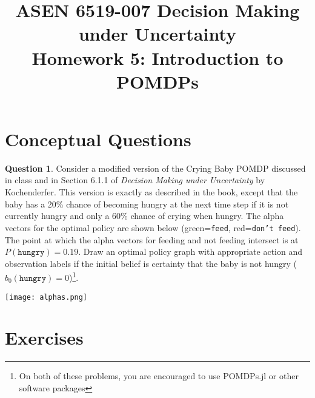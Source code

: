 \documentclass{article}
\title{ASEN 6519-007 Decision Making under Uncertainty\\
       Homework 5: Introduction to POMDPs}
\theoremstyle{definition}
\newtheorem{question}[thm]{Question}
\begin{document}
\maketitle

\section{Conceptual Questions}

\begin{question}
    Consider a modified version of the Crying Baby POMDP discussed in class and in Section 6.1.1 of \emph{Decision Making under Uncertainty} by Kochenderfer. This version is exactly as described in the book, except that the baby has a 20\% chance of becoming hungry at the next time step if it is not currently hungry and only a 60\% chance of crying when hungry. The alpha vectors for the optimal policy are shown below (green=\texttt{feed}, red=\texttt{don't feed}). The point at which the alpha vectors for feeding and not feeding intersect is at $P(\texttt{hungry}) = 0.19$. Draw an optimal policy graph with appropriate action and observation labels if the initial belief is certainty that the baby is not hungry ($b_0(\texttt{hungry}) = 0$)\footnote{On both of these problems, you are encouraged to use POMDPs.jl or other software packages}.

\begin{center}
    \texttt{[image: alphas.png]}
\end{center}

\end{question}

\pagebreak

\section{Exercises}
\end{document}
